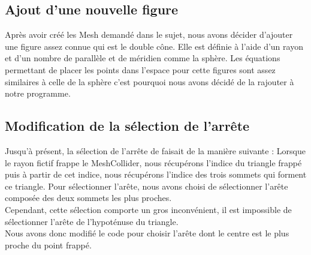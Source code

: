 \documentclass[a4paper,oneside,12pt,titlepage]{article}
\begin{document}
\subsection{Ajout d'une nouvelle figure}
Après avoir créé les Mesh demandé dans le sujet, nous avons décider d'ajouter une figure assez connue qui est le double cône. Elle est définie à l'aide d'un rayon et d'un nombre de parallèle et de méridien comme la sphère. Les équations permettant de placer les points dans l'espace pour cette figures sont assez similaires à celle de la sphère c'est pourquoi nous avons décidé de la rajouter à notre programme. 

\subsection{Modification de la sélection de l'arrête}
Jusqu'à présent, la sélection de l'arrête de faisait de la manière suivante : Lorsque le rayon fictif frappe le MeshCollider, nous récupérons l'indice du triangle frappé puis à partir de cet indice, nous récupérons l'indice des trois sommets qui forment ce triangle. Pour sélectionner l'arête, nous avons choisi de sélectionner l'arête composée des deux sommets les plus proches. 
\\Cependant, cette sélection comporte un gros inconvénient, il est impossible de sélectionner l'arête de l'hypoténuse du triangle. \\
Nous avons donc modifié le code pour choisir l'arête dont le centre est le plus proche du point frappé.
\end{document}
